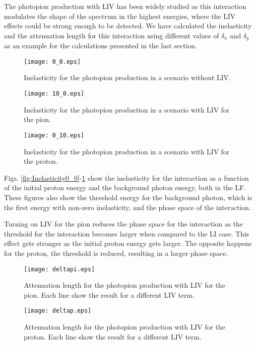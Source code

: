 \documentclass[a4paper]{jpconf}
\begin{document}
The photopion production with LIV has been widely studied \cite{AlfaroPalma,Stecker2005,Scully2009,Xiao-Jun2009,Bietenholz,Saveliev,Cowsik2012,Boncioli2015,Aloisio2000} as this interaction modulates the shape of the spectrum in the highest energies, where the LIV effects could be strong enough to be detected. We have calculated the inelasticity and the attenuation length for this interaction using different values of $\delta_{\pi}$ and $\delta_{p}$ as an example for the calculations presented in the last section.

\begin{figure}[h]
\centering
\begin{minipage}{11.5pc}
\texttt{[image: 0\_0.eps]}
\caption{\label{fig:Inelasticity0_0}Inelasticity for the photopion production in a scenario without LIV.}
\end{minipage}\hspace{1.5pc}%
\begin{minipage}{11.5pc}
\texttt{[image: 10\_0.eps]}
\caption{\label{fig:Inelasticity10_0}Inelasticity for the photopion production in a scenario with LIV for the pion.}
\end{minipage} \hspace{1.5pc}%
\begin{minipage}{11.5pc}
\texttt{[image: 0\_10.eps]}
\caption{\label{fig:Inelasticity0_10}Inelasticity for the photopion production in a scenario with LIV for the proton.}
\end{minipage}
\end{figure}

Figs. \ref{fig:Inelasticity0_0}-\ref{fig:Inelasticity0_10} show the inelasticity for the interaction as a function of the initial proton energy and the background photon energy, both in the LF. These figures also show the threshold energy for the background photon, which is the first energy with non-zero inelasticity, and the phase space of the interaction.

Turning on LIV for the pion reduces the phase space for the interaction as the threshold for the interaction becomes larger when compared to the LI case. This effect gets stronger as the initial proton energy gets larger. The opposite happens for the proton, the threshold is reduced, resulting in a larger phase space.

\begin{figure}[h]
\centering
\begin{minipage}{16pc}
\texttt{[image: deltapi.eps]}
\caption{\label{fig:AttLengthPion}Attenuation length for the photopion production with LIV for the pion. Each line show the result for a different LIV term.}
\end{minipage}\hspace{2pc}%
\begin{minipage}{16pc}
\texttt{[image: deltap.eps]}
\caption{\label{fig:AttLengthProton}Attenuation length for the photopion production with LIV for the proton. Each line show the result for a different LIV term.}\end{minipage}
\end{figure}
\end{document}
